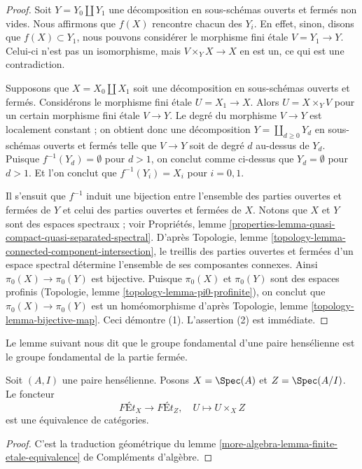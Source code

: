 \begin{proof}
Soit $Y = Y_0 \amalg Y_1$ une décomposition en sous-schémas ouverts et fermés
non vides. Nous affirmons que $f(X)$ rencontre chacun des $Y_i$. En effet, sinon,
disons que $f(X) \subset Y_1$, nous pouvons considérer le morphisme fini étale
$V = Y_1 \to Y$. Celui-ci n'est pas un isomorphisme,
mais $V \times_Y X \to X$ en est un, ce qui
est une contradiction.

\medskip\noindent
Supposons que $X = X_0 \amalg X_1$ soit une décomposition en sous-schémas
ouverts et fermés. Considérons le morphisme fini étale $U = X_1 \to X$. Alors
$U = X \times_Y V$ pour un certain morphisme fini étale $V \to Y$. Le degré
du morphisme $V \to Y$ est localement constant ; on obtient donc une décomposition
$Y = \coprod_{d \geq 0} Y_d$ en sous-schémas ouverts et fermés
telle que $V \to Y$ soit de degré $d$ au-dessus de $Y_d$. Puisque
$f^{-1}(Y_d) = \emptyset$ pour $d > 1$, on conclut comme ci-dessus que $Y_d = \emptyset$
pour $d > 1$. Et l'on conclut que $f^{-1}(Y_i) = X_i$
pour $i = 0, 1$.

\medskip\noindent
Il s'ensuit que $f^{-1}$ induit une bijection entre l'ensemble des parties
ouvertes et fermées de $Y$ et celui des parties ouvertes et fermées de $X$.
Notons que $X$ et $Y$ sont des espaces spectraux ; voir Propriétés, lemme
\ref{properties-lemma-quasi-compact-quasi-separated-spectral}.
D'après Topologie, lemme \ref{topology-lemma-connected-component-intersection},
le treillis des parties ouvertes et fermées d'un espace spectral
détermine l'ensemble de ses composantes connexes.
Ainsi $\pi_0(X) \to \pi_0(Y)$ est bijective. Puisque $\pi_0(X)$ et
$\pi_0(Y)$ sont des espaces profinis
(Topologie, lemme \ref{topology-lemma-pi0-profinite}),
on conclut que $\pi_0(X) \to \pi_0(Y)$ est un homéomorphisme d'après
Topologie, lemme \ref{topology-lemma-bijective-map}. Ceci démontre (1).
L'assertion (2) est immédiate.
\end{proof}

\noindent
Le lemme suivant nous dit que le groupe fondamental d'une paire hensélienne
est le groupe fondamental de la partie fermée.

\begin{lemma}
\label{lemma-gabber}
Soit $(A, I)$ une paire hensélienne. Posons $X = \Spec(A)$ et $Z = \Spec(A/I)$.
Le foncteur
$$
\textit{F\'Et}_X \longrightarrow \textit{F\'Et}_Z,\quad
U \longmapsto U \times_X Z
$$
est une équivalence de catégories.
\end{lemma}

\begin{proof}
C'est la traduction géométrique du
lemme \ref{more-algebra-lemma-finite-etale-equivalence} de Compléments d'algèbre.
\end{proof}


